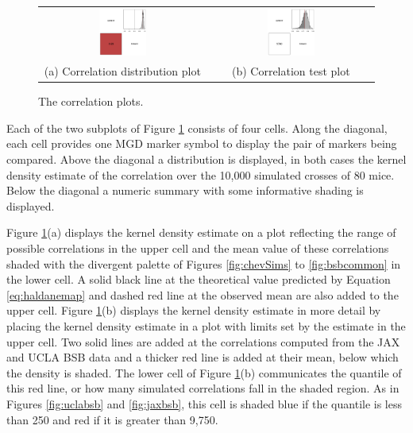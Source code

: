\documentclass{article}
\begin{document}
\begin{figure}[htp]
  \begin{center}
    \begin{tabular}{cc}
      \includegraphics[width = 0.300\textwidth]{./img/bsbCorr2by2.png} &
      \includegraphics[width = 0.300\textwidth]{./img/bsbCorrTest2by2.png} \\
      {\footnotesize (a) Correlation distribution plot} &
      {\footnotesize (b) Correlation test plot} \\
    \end{tabular}
  \end{center}
  \caption{The correlation plots.}
  \label{fig:2by2}
\end{figure}

Each of the two subplots of Figure \ref{fig:2by2} consists of four cells. Along the diagonal, each cell provides one MGD marker symbol to display the pair of markers being compared. Above the diagonal a distribution is displayed, in both cases the kernel density estimate of the correlation over the 10,000 simulated crosses of 80 mice. Below the diagonal a numeric summary with some informative shading is displayed.

Figure \ref{fig:2by2}(a) displays the kernel density estimate on a plot reflecting the range of possible correlations in the upper cell and the mean value of these correlations shaded with the divergent palette of Figures \ref{fig:chevSims} to \ref{fig:bsbcommon} in the lower cell. A solid black line at the theoretical value predicted by Equation \ref{eq:haldanemap} and dashed red line at the observed mean are also added to the upper cell. Figure \ref{fig:2by2}(b) displays the kernel density estimate in more detail by placing the kernel density estimate in a plot with limits set by the estimate in the upper cell. Two solid lines are added at the correlations computed from the JAX and UCLA BSB data and a thicker red line is added at their mean, below which the density is shaded. The lower cell of Figure \ref{fig:2by2}(b) communicates the quantile of this red line, or how many simulated correlations fall in the shaded region. As in Figures \ref{fig:uclabsb} and \ref{fig:jaxbsb}, this cell is shaded blue if the quantile is less than 250 and red if it is greater than 9,750.
\end{document}
